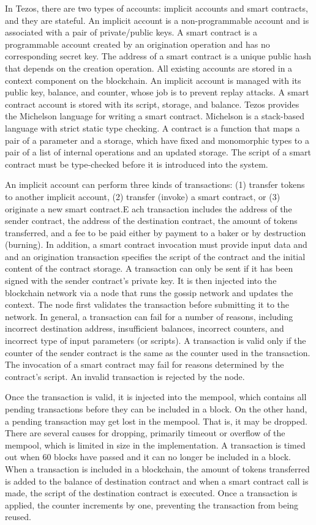 \documentclass[a4paper]{llncs}
\begin{document}
In Tezos, there are two types of accounts: implicit accounts and smart contracts, and they are stateful. An implicit account is a non-programmable account and is associated with a pair of private/public keys. A smart contract is a programmable account created by an origination operation and has no corresponding secret key. The address of a smart contract is a unique public hash that depends on the creation operation. All existing accounts are stored in a context component on the blockchain. An implicit account is managed with its public key, balance, and counter, whose job is to prevent replay attacks. A smart contract account is stored with its script, storage, and balance. Tezos provides the Michelson language for writing a smart contract. Michelson is a stack-based language with strict static type checking. A contract is a function that maps a pair of a parameter and a storage, which have fixed and monomorphic types to a pair of a list of internal operations and an updated storage. The script of a smart contract must be type-checked before it is introduced into the system.  

An implicit account can perform three kinds of transactions: (1) transfer tokens to another implicit account, (2) transfer (invoke) a smart contract, or (3) originate a new smart contract.E ach transaction includes the address of the sender contract, the address of the destination contract, the amount of tokens transferred, and a fee to be paid either by payment to a baker or by destruction (burning). In addition, a smart contract invocation must provide input data and and an origination transaction specifies the script of the contract and the initial content of the contract storage.  A transaction can only be sent if it has been signed with the sender contract's private key. It is then injected into the blockchain network via a node that runs the gossip network and updates the context. The node first validates the transaction before submitting it to the network. In general, a transaction can fail for a number of reasons, including incorrect destination address, insufficient balances, incorrect counters, and incorrect type of input parameters (or scripts). A transaction is valid only if the counter of the sender contract is the same as the counter  used in the transaction. The invocation of a smart contract may fail for reasons determined by the contract's script. An invalid transaction is rejected by the node.

Once the transaction is valid, it is injected into the mempool, which contains all pending transactions before they can be included in a block. On the other hand, a pending transaction may get lost in the mempool. That is, it may be dropped. There are several
causes for dropping, primarily timeout or overflow of the mempool, which is limited in size in the implementation. A transaction is timed out when 60 blocks have passed and it can no longer be included in a block. When a transaction is included in a blockchain, the amount of tokens transferred is added to the balance of destination contract and when a smart contract call is made, the script of the destination contract is executed. Once a transaction is applied, the counter increments by one, preventing the transaction from being reused.
\end{document}
